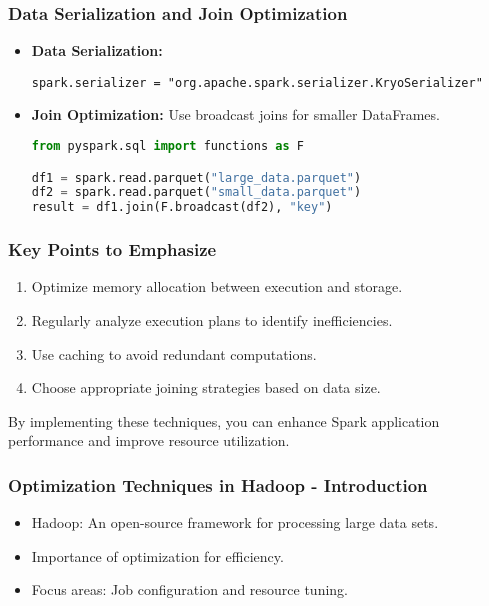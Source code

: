 \documentclass{beamer}
\begin{document}
\begin{frame}[fragile]
    \frametitle{Data Serialization and Join Optimization}
    \begin{itemize}
        \item \textbf{Data Serialization:}
        \begin{lstlisting}
spark.serializer = "org.apache.spark.serializer.KryoSerializer"
        \end{lstlisting}
        
        \item \textbf{Join Optimization:}
        Use broadcast joins for smaller DataFrames.
        \begin{lstlisting}[language=Python]
from pyspark.sql import functions as F

df1 = spark.read.parquet("large_data.parquet")
df2 = spark.read.parquet("small_data.parquet")
result = df1.join(F.broadcast(df2), "key")
        \end{lstlisting}
    \end{itemize}
\end{frame}

\begin{frame}
    \frametitle{Key Points to Emphasize}
    \begin{enumerate}
        \item Optimize memory allocation between execution and storage.
        \item Regularly analyze execution plans to identify inefficiencies.
        \item Use caching to avoid redundant computations.
        \item Choose appropriate joining strategies based on data size.
    \end{enumerate}

    By implementing these techniques, you can enhance Spark application performance and improve resource utilization.
\end{frame}

\begin{frame}[fragile]
    \frametitle{Optimization Techniques in Hadoop - Introduction}
    \begin{itemize}
        \item Hadoop: An open-source framework for processing large data sets.
        \item Importance of optimization for efficiency.
        \item Focus areas: Job configuration and resource tuning.
    \end{itemize}
\end{frame}
\end{document}
